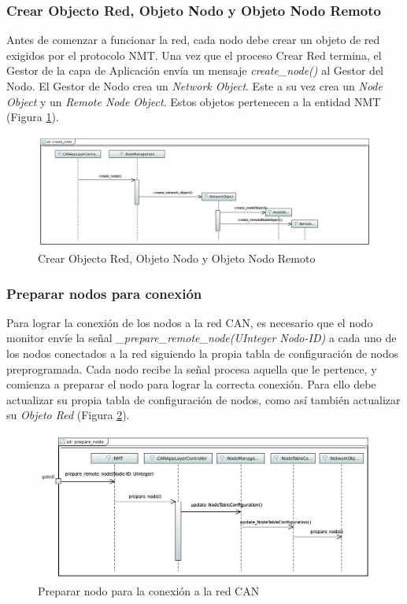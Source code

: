 \subsubsection{Crear Objecto Red, Objeto Nodo y Objeto Nodo Remoto}
Antes de comenzar a funcionar la red, cada nodo debe crear un objeto de red
exigidos por el protocolo NMT. Una vez que el proceso Crear Red termina,
el Gestor de la capa de Aplicación envía un mensaje \textit{create\_node()}
al Gestor del Nodo. El Gestor de Nodo crea un \textit{Network Object}. Este a su
vez crea un \textit{Node Object} y un \textit{Remote Node Object}. Estos objetos
pertenecen a la entidad NMT (Figura \ref{fig:CreateNode}).

\begin{figure}[h!]
 \centering
 \includegraphics[scale=0.4]{images/Secciones/AppendixA/create_node.JPG}
  \caption{Crear Objecto Red, Objeto Nodo y Objeto Nodo Remoto}
  \label{fig:CreateNode}
\end{figure}

\subsubsection{Preparar nodos para conexión}
Para lograr la conexión de los nodos a la red CAN, es necesario que el nodo
monitor envíe la señal \textit{_prepare\_remote\_node(UInteger Nodo-ID)} a
cada uno de los nodos conectados a la red siguiendo la propia tabla de
configuración de nodos preprogramada. Cada nodo recibe la señal procesa aquella
que le pertence, y comienza a preparar el nodo para lograr la correcta conexión.
Para ello debe actualizar su propia tabla de configuración de nodos, como así
también actualizar su \textit{Objeto Red} (Figura \ref{fig:PrepareNode}).

\begin{figure}[h!]
 \centering
 \includegraphics[scale=0.4]{images/Secciones/AppendixA/PrepareNode.JPG}
  \caption{Preparar nodo para la conexión a la red CAN}
  \label{fig:PrepareNode}
\end{figure}


